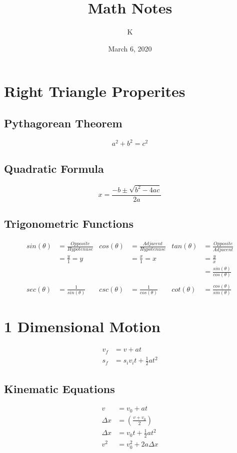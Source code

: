 \documentclass[12pt, letterpaper]{article}
\title{Math Notes}
\author{K}
\date{March 6, 2020}
\begin{document}
\maketitle
\tableofcontents{}
\pagebreak

\section{Right Triangle Properites}
\subsection{Pythagorean Theorem}
\begin{equation*}
  a^2 + b^2 = c^2
\end{equation*}

\subsection{Quadratic Formula}
\begin{equation*}
  x = \frac{-b \pm \sqrt{b^2 - 4ac}}{2a}
\end{equation*}

\subsection{Trigonometric Functions}
\begin{align*}
  sin(\theta) &= \frac{Opposite}{Hypotenuse}&
    cos(\theta) &= \frac{Adjacent}{Hypotenuse}&
    tan(\theta) &= \frac{Opposite}{Adjacent}\\
  &= \frac{y}{1} = y&
    &= \frac{x}{1} = x&
    &= \frac{y}{x}\\
  &&
    &&
    &= \frac{sin(\theta)}{cos(\theta)}\\
    \\
  sec(\theta) &= \frac{1}{sin(\theta)}&
    csc(\theta) &= \frac{1}{cos(\theta)}&
    cot(\theta) &= \frac{cos(\theta)}{sin(\theta)}
\end{align*}

\section{1 Dimensional Motion}
\begin{align*}
  v_f &= v + at\\
  s_f &= s_i v_i t + \frac{1}{2} a t^2
\end{align*}

\subsection{Kinematic Equations}
\begin{align*}
  v &= v_0 +at\\
  \Delta x &= \left( \frac{v+v_0}{2} \right)\\
  \Delta x &= v_0 t + \frac{1}{2} a t^2\\
  v^2 &= v_0^2 + 2a\Delta x
\end{align*}
\end{document}
